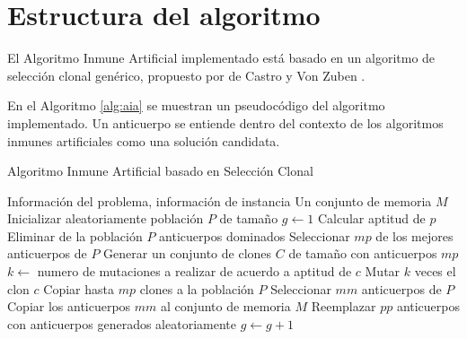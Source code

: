 \section{Estructura del algoritmo}

El Algoritmo Inmune Artificial implementado está basado en un algoritmo de selección clonal genérico, propuesto por de Castro y Von Zuben \cite{read2012introduction}.

En el Algoritmo \ref{alg:aia} se muestran un pseudocódigo del algoritmo implementado. Un anticuerpo se entiende dentro del contexto de los algoritmos inmunes artificiales como una solución candidata. 

\begin{algorithm}
\caption{Algoritmo Inmune Artificial basado en Selección Clonal}\label{alg:aia}
\begin{algorithmic}[1]
\REQUIRE  Información del problema, información de instancia
\ENSURE Un conjunto de memoria $M$
\STATE Inicializar aleatoriamente población $P$ de tamaño \popsize
\STATE $g \leftarrow 1$
		\STATE Calcular aptitud de $p$
	\ENDFOR
	\STATE Eliminar de la población $P$ anticuerpos dominados
	\STATE Seleccionar $mp$ de los mejores anticuerpos de $P$
	\STATE Generar un conjunto de clones $C$ de tamaño \clonsize con anticuerpos $mp$
		\STATE $k \leftarrow$ numero de mutaciones a realizar de acuerdo a aptitud de $c$		
		\STATE Mutar $k$ veces el clon $c$
	\ENDFOR
	\STATE Copiar hasta $mp$ clones a la población $P$
	\STATE Seleccionar $mm$ anticuerpos de $P$
	\STATE Copiar los anticuerpos $mm$ al conjunto de memoria $M$
	\STATE Reemplazar $pp$ anticuerpos con anticuerpos generados aleatoriamente
	\STATE $g \leftarrow g+1$
\ENDWHILE
\end{algorithmic}
\end{algorithm}

